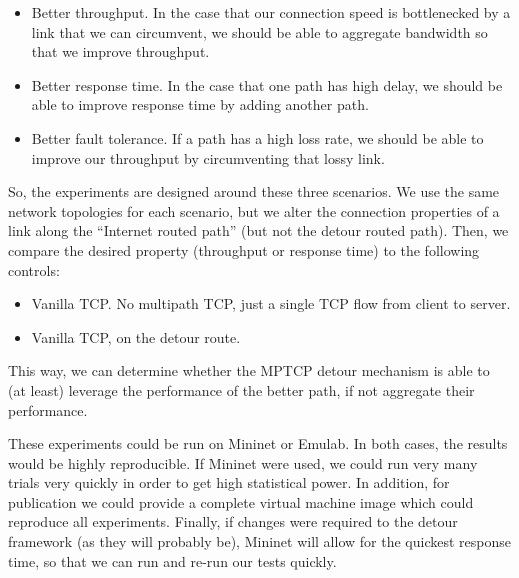 \documentclass{article}
\begin{document}
\begin{itemize}
\item Better throughput. In the case that our connection speed is bottlenecked
  by a link that we can circumvent, we should be able to aggregate bandwidth so
  that we improve throughput.
\item Better response time. In the case that one path has high delay, we should
  be able to improve response time by adding another path.
\item Better fault tolerance. If a path has a high loss rate, we should be able
  to improve our throughput by circumventing that lossy link.
\end{itemize}

So, the experiments are designed around these three scenarios. We use the same
network topologies for each scenario, but we alter the connection properties of
a link along the ``Internet routed path'' (but not the detour routed path).
Then, we compare the desired property (throughput or response time) to the
following controls:

\begin{itemize}
\item Vanilla TCP. No multipath TCP, just a single TCP flow from client to
  server.
\item Vanilla TCP, on the detour route.
\end{itemize}

This way, we can determine whether the MPTCP detour mechanism is able to (at
least) leverage the performance of the better path, if not aggregate their
performance.

These experiments could be run on Mininet or Emulab. In both cases, the results
would be highly reproducible. If Mininet were used, we could run very many
trials very quickly in order to get high statistical power. In addition, for
publication we could provide a complete virtual machine image which could
reproduce all experiments. Finally, if changes were required to the detour
framework (as they will probably be), Mininet will allow for the quickest
response time, so that we can run and re-run our tests quickly.
\end{document}

